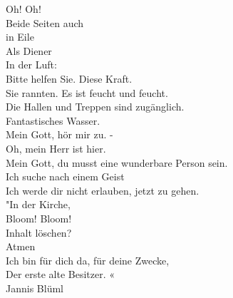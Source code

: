 {		Oh! Oh! \\
		Beide Seiten auch \\
		in Eile \\
		Als Diener \\
		In der Luft: \\
		Bitte helfen Sie. Diese Kraft. \\
		
		Sie rannten. Es ist feucht und feucht. \\
		Die Hallen und Treppen sind zugänglich. \\
		Fantastisches Wasser. \\
		Mein Gott, hör mir zu. - \\
		Oh, mein Herr ist hier. \\
		Mein Gott, du musst eine wunderbare Person sein. \\
		Ich suche nach einem Geist \\
		Ich werde dir nicht erlauben, jetzt zu gehen. \\
		
		"In der Kirche, \\
		Bloom! Bloom! \\
		Inhalt löschen? \\
		Atmen \\
		Ich bin für dich da, für deine Zwecke, \\
		Der erste alte Besitzer. « \\
		
	
			
}
{Jannis Blüml}
